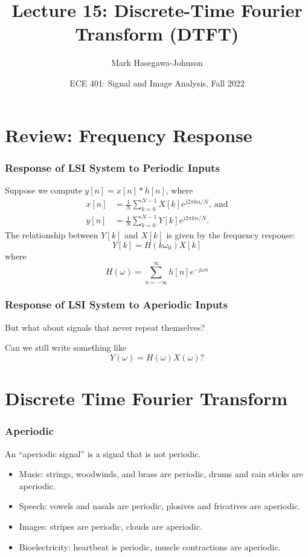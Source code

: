 \documentclass{beamer}
\title{Lecture 15: Discrete-Time Fourier Transform (DTFT)}
\author{Mark Hasegawa-Johnson}
\date{ECE 401: Signal and Image Analysis, Fall 2022}
\begin{document}
\begin{frame}
  \maketitle
\end{frame}

\begin{frame}
  \tableofcontents
\end{frame}

\section[Review]{Review: Frequency Response}
\setcounter{subsection}{1}

\begin{frame}
  \frametitle{Response of LSI System to Periodic Inputs}
  Suppose we compute $y[n]=x[n]\ast h[n]$, where
  \begin{align*}
  x[n] &= \frac{1}{N}\sum_{k=0}^{N-1} X[k] e^{j2\pi kn/N},~\mbox{and}\\
  y[n] &= \frac{1}{N}\sum_{k=0}^{N-1} Y[k] e^{j2\pi kn/N}.
  \end{align*}
  The relationship between $Y[k]$ and $X[k]$ is given by the frequency
  response:
  \[
  Y[k] = H(k\omega_0) X[k]
  \]
  where
  \[
  H(\omega) = \sum_{n=-\infty}^\infty h[n]e^{-j\omega n}
  \]
\end{frame}

\begin{frame}
  \frametitle{Response of LSI System to Aperiodic Inputs}

  But what about signals that never repeat themselves?

  Can we still write something like
  \[
  Y(\omega)=H(\omega)X(\omega)?
  \]

\end{frame}
  
\section[DTFT]{Discrete Time Fourier Transform}
\setcounter{subsection}{1}

\begin{frame}
  \frametitle{Aperiodic}
  
  An ``aperiodic signal'' is a signal that is not periodic.
  \begin{itemize}
  \item Music: strings, woodwinds, and brass are periodic, drums and rain sticks are aperiodic.
  \item Speech: vowels and nasals are periodic, plosives and fricatives are aperiodic.
  \item Images: stripes are periodic, clouds are aperiodic.
  \item Bioelectricity: heartbeat is periodic, muscle contractions are aperiodic.
  \end{itemize}
\end{frame}
\end{document}
